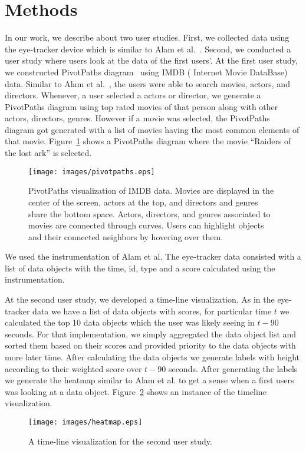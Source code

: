 ﻿\section{Methods}
\label{sec:Methods}
In our work, we describe about two user studies. First, we collected data using the eye-tracker device which is similar to Alam et al.~\cite{alamdata}. Second, we conducted a user study where users look at the data of the first users'. At the first user study, we constructed PivotPaths diagram~\cite{dork2012pivotpaths} using IMDB ( Internet Movie DataBase) data. Similar to Alam et al.~\cite{alamdata}, the users were able to search movies, actors, and directors. Whenever, a user selected a actors or director, we generate a PivotPaths diagram using top rated movies of that person along with other actors, directors, genres. However if a movie was selected, the PivotPaths diagram got generated with a list of movies having the most common elements of that movie. Figure~\ref{fig:pivotpaths} shows a PivotPaths diagram where the movie ``Raiders of the lost ark'' is selected. 
\begin{figure}[htb]
  \centering
  \texttt{[image: images/pivotpaths.eps]}
  \caption{PivotPaths visualization of IMDB data. Movies are displayed in the center of the screen, actors at the top, and directors and genres share the bottom space. Actors, directors, and genres associated to movies are connected through curves. Users can highlight objects and their connected neighbors by hovering over them.}
	\label{fig:pivotpaths}
\end{figure}

We used the instrumentation of Alam et al. The eye-tracker data consisted with a list of data objects with the time, id, type and a score calculated using the instrumentation. 

At the second user study, we developed a time-line visualization. As in the eye-tracker data we have a list of data objects with scores, for particular time $t$ we calculated the top 10 data objects which the user was likely seeing in $t-90$ seconds. For that implementation, we simply aggregated the data object list and sorted them based on their scores and provided priority to the data objects with more later time. After calculating the data objects we generate labels with height according to their weighted score over $t-90$ seconds. After generating the labels we generate the heatmap similar to Alam et al. to get a sense when a first users was looking at a data object. Figure~\ref{fig:heatmap} shows an instance of the timeline visualization.
\begin{figure}[htb]
  \centering
  \texttt{[image: images/heatmap.eps]}
  \caption{A time-line visualization for the second user study.}
	\label{fig:heatmap}
\end{figure}
